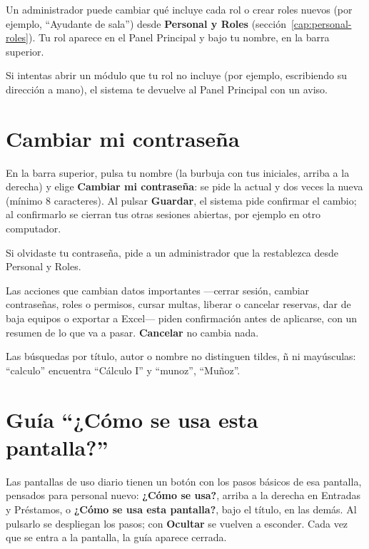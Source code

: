 \documentclass[11pt,a4paper]{report}
\begin{document}
Un administrador puede cambiar qué incluye cada rol o crear roles nuevos
(por ejemplo, ``Ayudante de sala'') desde \textbf{Personal y Roles}
(sección~\ref{cap:personal-roles}). Tu rol aparece en el Panel Principal
y bajo tu nombre, en la barra superior.

Si intentas abrir un módulo que tu rol no incluye (por ejemplo, escribiendo
su dirección a mano), el sistema te devuelve al Panel Principal con un
aviso.

\section{Cambiar mi contraseña}
\label{sec:cambiar-contrasena}

En la barra superior, pulsa tu nombre (la burbuja con tus iniciales,
arriba a la derecha) y elige \textbf{Cambiar mi contraseña}: se pide la
actual y dos veces la nueva (mínimo 8 caracteres). Al pulsar \textbf{Guardar}, el
sistema pide confirmar el cambio; al confirmarlo se cierran tus otras
sesiones abiertas, por ejemplo en otro computador.


Si olvidaste tu contraseña, pide a un administrador que la restablezca
desde Personal y Roles.

\begin{nota}
Las acciones que cambian datos importantes ---cerrar sesión, cambiar
contraseñas, roles o permisos, cursar multas, liberar o cancelar
reservas, dar de baja equipos o exportar a Excel--- piden confirmación
antes de aplicarse, con un resumen de lo que va a pasar. \textbf{Cancelar}
no cambia nada.
\end{nota}

\begin{nota}
Las búsquedas por título, autor o nombre no distinguen tildes, ñ ni
mayúsculas: ``calculo'' encuentra ``Cálculo I'' y ``munoz'', ``Muñoz''.
\end{nota}

\section{Guía ``¿Cómo se usa esta pantalla?''}

Las pantallas de uso diario tienen un botón con los pasos básicos de esa
pantalla, pensados para personal nuevo: \textbf{¿Cómo se usa?}, arriba a
la derecha en Entradas y Préstamos, o \textbf{¿Cómo se usa esta
pantalla?}, bajo el título, en las demás. Al pulsarlo se despliegan los
pasos; con \textbf{Ocultar} se vuelven a esconder. Cada vez que se entra a
la pantalla, la guía aparece cerrada.
\end{document}
